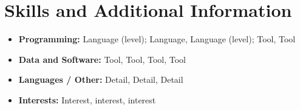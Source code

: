 \documentclass[10pt]{extarticle}
\begin{document}
\section*{Skills and Additional Information}
\begin{itemize}
  \item \textbf{Programming:} Language (level); Language, Language (level); Tool, Tool
  \item \textbf{Data and Software:} Tool, Tool, Tool, Tool
  \item \textbf{Languages / Other:} Detail, Detail, Detail
  \item \textbf{Interests:} Interest, interest, interest
\end{itemize}
\end{document}
